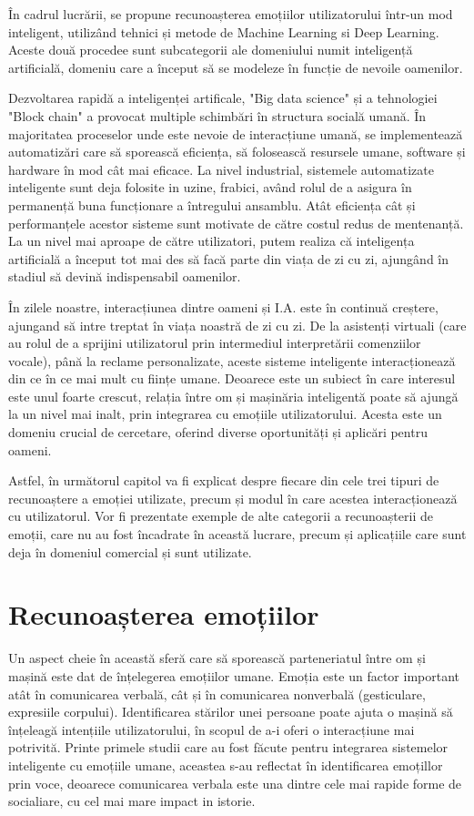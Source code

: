 \documentclass[a4paper, 12pt]{report}
\begin{document}
	În cadrul lucrării, se propune recunoașterea emoțiilor utilizatorului într-un mod inteligent, utilizând tehnici și metode de Machine Learning si Deep Learning. Aceste două procedee sunt subcategorii ale domeniului numit inteligență artificială, domeniu care a început să se modeleze în funcție de nevoile oamenilor.
	
	Dezvoltarea rapidă a inteligenței artificale, "Big data science" și a tehnologiei "Block chain" a provocat multiple schimbări în structura socială umană. În majoritatea proceselor unde este nevoie de interacțiune umană, se implementează automatizări care să sporească eficiența, să folosească resursele umane, software și hardware în mod cât mai eficace. La nivel industrial, sistemele automatizate inteligente sunt deja folosite in uzine, frabici, având rolul de a asigura în permanență buna funcționare a întregului ansamblu. Atât eficiența cât și performanțele acestor sisteme sunt motivate de către costul redus de mentenanță. La un nivel mai aproape de către utilizatori, putem realiza că inteligența artificială a început tot mai des să facă parte din viața de zi cu zi, ajungând în stadiul să devină indispensabil oamenilor.
	
	În zilele noastre, interacțiunea dintre oameni și I.A. este în continuă creștere, ajungand să intre treptat în viața noastră de zi cu zi. De la asistenți virtuali (care au rolul de a sprijini utilizatorul prin intermediul interpretării comenziilor vocale), până la reclame personalizate, aceste sisteme inteligente interacționează din ce în ce mai mult cu ființe umane. Deoarece este un subiect în care interesul este unul foarte crescut, relația între om și mașinăria inteligentă poate să ajungă la un nivel mai inalt, prin integrarea cu emoțiile utilizatorului. Acesta este un domeniu crucial de cercetare, oferind diverse oportunități și aplicări pentru oameni.
	
	Astfel, în următorul capitol va fi explicat despre fiecare din cele trei tipuri de recunoaștere a emoției utilizate, precum și modul în care acestea interacționează cu utilizatorul. Vor fi prezentate exemple de alte categorii a recunoașterii de emoții, care nu au fost încadrate în această lucrare, precum și aplicațiile care sunt deja în domeniul comercial și sunt utilizate.
	
	\clearpage
	\section{Recunoașterea emoțiilor}
	Un aspect cheie în această sferă care să sporească parteneriatul între om și mașină este dat de înțelegerea emoțiilor umane. Emoția este un factor important atât în comunicarea verbală, cât și în comunicarea nonverbală (gesticulare, expresiile corpului). Identificarea stărilor unei persoane poate ajuta o mașină să înțeleagă intențiile utilizatorului, în scopul de a-i oferi o interacțiune mai potrivită. Printe primele studii care au fost făcute pentru integrarea sistemelor inteligente cu emoțiile umane, aceastea s-au reflectat în identificarea emoțillor prin voce, deoarece comunicarea verbala este una dintre cele mai rapide forme de socialiare, cu cel mai mare impact in istorie.
	
\end{document}
